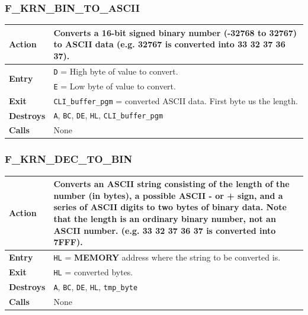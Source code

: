 \documentclass[a4paper,11pt]{article}
\begin{document}
        \subsubsection{F\_KRN\_BIN\_TO\_ASCII}
        \label{func:fkrnbintoascii}
        \begin{tabular}{l p{9cm}}
            \hline\textbf{Action}
            & Converts a 16-bit signed binary number (-32768 to 32767) to ASCII
            data (e.g. 32767 is converted into 33 32 37 36 37).\\
            \hline\multirow[t]{2}{4em}{\textbf{Entry}}
            & \texttt{D} = High byte of value to convert.\\
            & \texttt{E} = Low byte of value to convert.\\
            \hline\textbf{Exit} & \texttt{CLI\_buffer\_pgm} = converted ASCII data.
            First byte us the length.\\
            \hline\textbf{Destroys} & \texttt{A}, \texttt{BC}, \texttt{DE}, 
            \texttt{HL}, \texttt{CLI\_buffer\_pgm}\\
            \hline\textbf{Calls} & None\\
            \hline
        \end{tabular}

        \subsubsection{F\_KRN\_DEC\_TO\_BIN}
        \label{func:fkrndectobin}
        \begin{tabular}{l p{9cm}}
            \hline\textbf{Action}
            & Converts an ASCII string consisting of the length of the number
            (in bytes), a possible ASCII - or + sign, and a series of ASCII
            digits to two bytes of binary data. Note that the length is an
            ordinary binary number, not an ASCII number. (e.g. 33 32 37 36 37 is
            converted into 7FFF).\\
            \hline\textbf{Entry} & \texttt{HL} = \textbf{MEMORY} address where
            the string to be converted is.\\
            \hline\textbf{Exit} & \texttt{HL} = converted bytes.\\
            \hline\textbf{Destroys} & \texttt{A}, \texttt{BC}, \texttt{DE}, 
            \texttt{HL}, \texttt{tmp\_byte}\\
            \hline\textbf{Calls} & None\\
            \hline
        \end{tabular}
\end{document}

